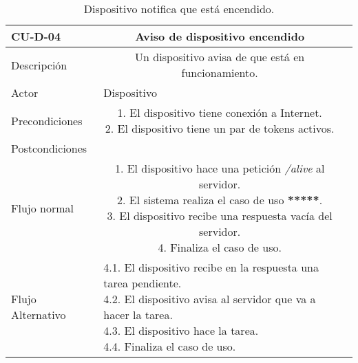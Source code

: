 \begin{table}[]
\centering
	\setlength{\extrarowheight}{3pt}
		\begin{tabular}{rc{1.85cm}|c{8cm}}
	    \hline
        \multicolumn{1}{|l}{ \textbf{CU-D-04}}     & \multicolumn{1}{c|}{\textbf{Aviso de dispositivo encendido} } \\
	    \hline \hline
	    \multicolumn{1}{|l}{Descripción}     & \multicolumn{1}{Y|}{
	    Un dispositivo avisa de que está en funcionamiento.
	    }  \\ \cline{1-2}
	    \multicolumn{1}{|l}{Actor}           & \multicolumn{1}{l|}{Dispositivo}  \\ \cline{1-2}
	    \multicolumn{1}{|l}{Precondiciones}  & \multicolumn{1}{Y|}{
1. El dispositivo tiene conexión a Internet.\newline
2. El dispositivo tiene un par de tokens activos.}  \\ \cline{1-2}
	    \multicolumn{1}{|l}{Postcondiciones} & \multicolumn{1}{l|}{}\\ \cline{1-2}
	    \multicolumn{1}{|l}{Flujo normal}    & \multicolumn{1}{Y|}{
1. El dispositivo hace una petición \textit{/alive} al servidor. \newline
2. El sistema realiza el caso de uso \textbf{*****}. \newline
3. El dispositivo recibe una respuesta vacía del servidor. \newline
4. Finaliza el caso de uso.
	    } \\ \cline{1-2}
	    \multicolumn{1}{|l}{Flujo Alternativo} & \multicolumn{1}{l|}{
4.1. El dispositivo recibe en la respuesta una tarea pendiente. \newline
4.2. El dispositivo avisa al servidor que va a hacer la tarea. \newline
4.3. El dispositivo hace la tarea. \newline
4.4. Finaliza el caso de uso.
	    }\\ \cline{1-2}
	    \hline
	    \end{tabular}
	\label{table:cu-d-03}
	\caption{Dispositivo notifica que está encendido.}
\end{table}



